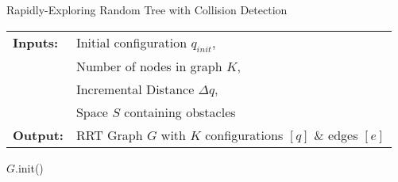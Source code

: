\bigskip
\begin{algorithm}[H]
    \caption{Rapidly-Exploring Random Tree with Collision Detection}
    \SetAlgoLined
    \begin{tabular}{l l}
    \textbf{Inputs:}    & Initial \gls{configuration} $q_{init}$,\\ 
                        & Number of nodes in graph $K$, \\
                        & Incremental Distance $\Delta q$, \\
                        & Space $S$ containing obstacles \\
    \textbf{Output:}    & RRT Graph $G$ with $K$ \gls{configuration}s $[q]$ \& edges $[e]$ \\
    \end{tabular}

        $G$.init()\;
\label{algorithm:rrt_collision}
\end{algorithm}
\bigskip